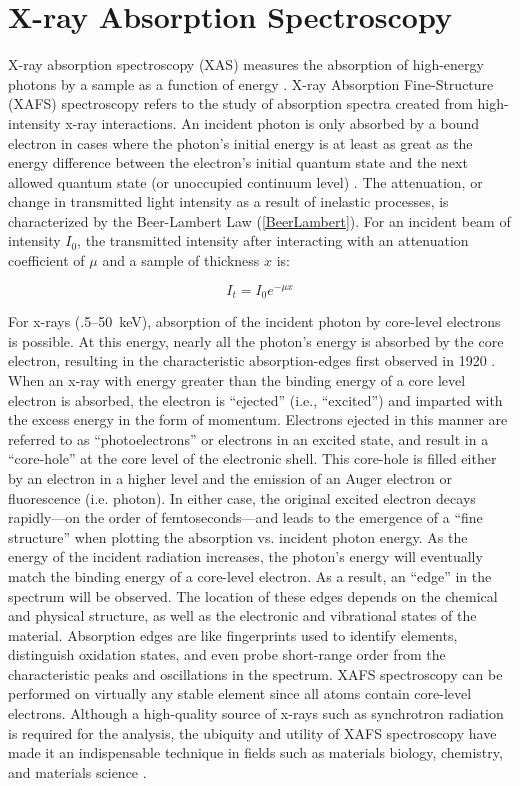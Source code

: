 \section{X-ray Absorption Spectroscopy}
X-ray absorption spectroscopy (XAS) measures the absorption of high-energy photons by a sample as a function of energy \cite{gardenghi2012synchrotron}. X-ray Absorption Fine-Structure (XAFS) spectroscopy refers to the study of absorption spectra created from high-intensity x-ray interactions. An incident photon is only absorbed by a bound electron in cases where the photon's initial energy is at least as great as the energy difference between the electron’s initial quantum state and the next allowed quantum state (or unoccupied continuum level) \cite{einstein1905photoelectriceffect}. The attenuation, or change in transmitted light intensity as a result of inelastic processes, is characterized by the Beer-Lambert Law (\ref{BeerLambert}). For an incident beam of intensity $I_0$, the transmitted intensity after interacting with an attenuation
coefficient of $ \mu $ and a sample of thickness $ x $ is: 

\begin{equation}
    \label{BeerLambert}
    I_t = I_0 e^{-\mu x}
\end{equation}

For x-rays (.5--50~keV), absorption of the incident photon by core-level electrons is possible. At this energy, nearly all the photon's energy is absorbed by the core electron, resulting in the characteristic absorption-edges first observed in 1920 \cite{fricke1920, hertz1920ueber}. When an x-ray with energy greater than the binding energy of a core level electron is absorbed, the electron is ``ejected'' (i.e., ``excited'') and imparted with the excess energy in the form of momentum. Electrons ejected in this manner are referred to as ``photoelectrons'' or electrons in an excited state, and result in a ``core-hole'' at the core level of the electronic shell. This core-hole is filled either by an electron in a higher level and the emission of an Auger electron or fluorescence (i.e. photon). In either case, the original excited electron decays rapidly---on the order of femtoseconds---and leads to the emergence of a ``fine structure'' when plotting the absorption vs. incident photon energy. As the energy of the incident radiation increases, the photon's energy will eventually match the binding energy of a core-level electron. As a result, an ``edge'' in the spectrum will be observed. The location of these edges depends on the chemical and physical structure, as well as the electronic and vibrational states of the material. Absorption edges are like fingerprints used to identify elements, distinguish oxidation states, and even probe short-range order from the characteristic peaks and oscillations in the spectrum. XAFS spectroscopy can be performed on virtually any stable element since all atoms contain core-level electrons. Although a high-quality source of x-rays such as synchrotron radiation is required for the analysis, the ubiquity and utility of XAFS spectroscopy have made it an indispensable technique in fields such as materials biology, chemistry, and materials science \cite{rehrXAFS2000review} \cite{newville2014fundamentals}.

